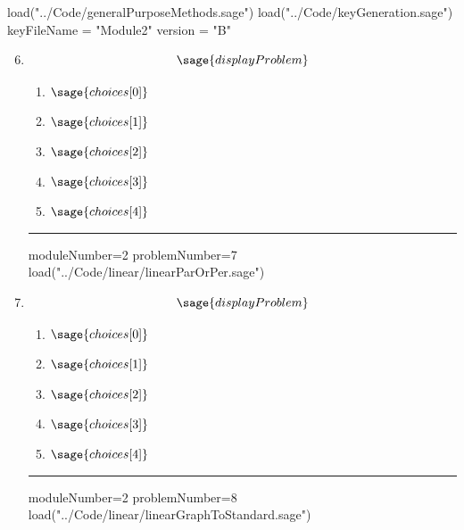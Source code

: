 \documentclass[14pt]{article}
\newcommand{\litem}[1]{\item#1\hspace*{-1cm}\rule{\textwidth}{0.4pt}}
\begin{document}
\pagestyle{fancy}

\begin{sagesilent}
load("../Code/generalPurposeMethods.sage")
load("../Code/keyGeneration.sage")
keyFileName = "Module2"
version = "B"
\end{sagesilent}

\begin{enumerate}
\setcounter{enumi}{5}


\begin{sagesilent}
moduleNumber=2
problemNumber=6
load("../Code/linear/solveRationalLinear.sage")
\end{sagesilent}

\litem{ 

 \[ \sage{displayProblem} \]

	\begin{enumerate}[label=\Alph*.]
    \item \( \sage{choices[0]} \)
    \item \( \sage{choices[1]} \)
    \item \( \sage{choices[2]} \)
    \item \( \sage{choices[3]} \)
    \item \( \sage{choices[4]} \)
	\end{enumerate}

}

\begin{sagesilent}
moduleNumber=2
problemNumber=7
load("../Code/linear/linearParOrPer.sage")
\end{sagesilent}

\litem{	

\[ \sage{displayProblem} \]

	\begin{enumerate}[label=\Alph*.]
    \item \( \sage{choices[0]} \)
    \item \( \sage{choices[1]} \)
    \item \( \sage{choices[2]} \)
    \item \( \sage{choices[3]} \)
    \item \( \sage{choices[4]} \)
	\end{enumerate}

}

\begin{sagesilent}
moduleNumber=2
problemNumber=8
load("../Code/linear/linearGraphToStandard.sage")
\end{sagesilent}


\end{enumerate}
\end{document}
